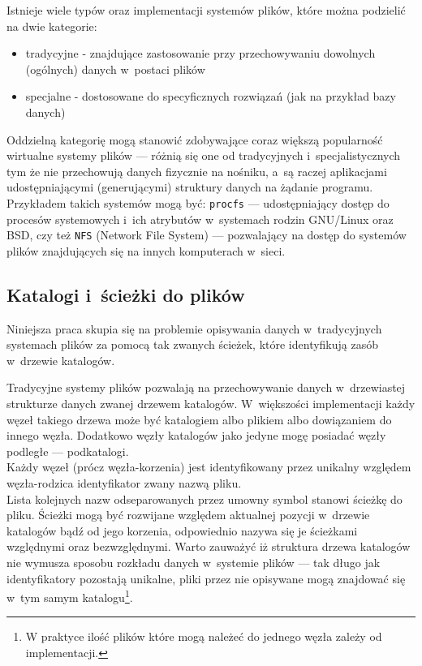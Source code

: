 \par
Istnieje wiele typów oraz implementacji systemów plików, które można podzielić na dwie kategorie:

\begin{itemize}
\item tradycyjne - znajdujące zastosowanie przy przechowywaniu dowolnych (ogólnych) danych w~postaci plików
\item specjalne - dostosowane do specyficznych rozwiązań (jak na przykład bazy danych)
\end{itemize}

Oddzielną kategorię mogą stanowić zdobywające coraz większą popularność wirtualne systemy plików --- różnią się one od tradycyjnych i~specjalistycznych tym że nie przechowują danych fizycznie na nośniku, a~są raczej aplikacjami udostępniającymi (generującymi) struktury danych na żądanie programu. Przykładem takich systemów mogą być: \texttt{procfs} --- udostępniający dostęp do procesów systemowych i~ich atrybutów w~systemach rodzin GNU/Linux oraz BSD, czy też \texttt{NFS} (Network File System) --- pozwalający na dostęp do systemów plików znajdujących się na innych komputerach w~sieci\cite{website:filesystems-howto}.

\subsection{Katalogi i~ścieżki do plików}
\par
Niniejsza praca skupia się na problemie opisywania danych w~tradycyjnych systemach plików za pomocą tak zwanych ścieżek, które identyfikują zasób w~drzewie katalogów\cite{wiki:path}.

\par
Tradycyjne systemy plików pozwalają na przechowywanie danych w~drzewiastej strukturze danych zwanej drzewem katalogów. W~większości implementacji każdy węzeł takiego drzewa może być katalogiem albo plikiem albo dowiązaniem do innego węzła. Dodatkowo węzły katalogów jako jedyne mogę posiadać węzły podległe --- podkatalogi\cite{website:filesystems-howto}.\\
Każdy węzeł (prócz węzła-korzenia) jest identyfikowany przez unikalny względem węzła-rodzica identyfikator zwany nazwą pliku.\\
Lista kolejnych nazw odseparowanych przez umowny symbol stanowi ścieżkę do pliku.
Ścieżki mogą być rozwijane względem aktualnej pozycji w~drzewie katalogów bądź od jego korzenia, odpowiednio nazywa się je ścieżkami względnymi oraz bezwzględnymi.
Warto zauważyć iż struktura drzewa katalogów nie wymusza sposobu rozkładu danych w~systemie plików --- tak długo jak identyfikatory pozostają unikalne, pliki przez nie opisywane mogą znajdować się w~tym samym katalogu\footnote{W praktyce ilość plików które mogą należeć do jednego węzła zależy od implementacji.}.

